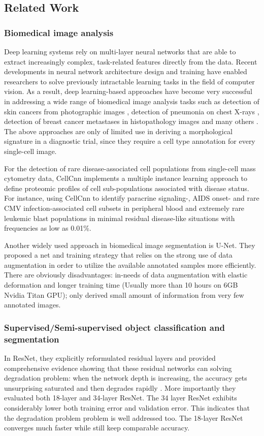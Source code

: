 \subsection{Related Work}
\subsubsection{Biomedical image analysis}

Deep learning systems rely on multi-layer neural networks that are able to extract increasingly complex, task-related features directly from the data. Recent developments in neural network architecture design and training have enabled researchers to solve previously intractable learning tasks in the field of computer vision. As a result, deep learning-based approaches have become very successful in addressing a wide range of biomedical image analysis tasks such as detection of skin cancers from photographic images \cite{b10}, detection of pneumonia on chest X-rays \cite{b13}, detection of breast cancer metastases in histopathology images and many others \cite{b2}. 
The above approaches are only of limited use in deriving a morphological signature in a diagnostic trial, since they require a cell type annotation for every single-cell image.


For the detection of rare disease-associated cell populations from single-cell mass cytometry data, CellCnn \cite{b3} implements a multiple instance learning approach to define proteomic profiles of cell sub-populations associated with disease status. For instance, using CellCnn to identify paracrine signaling-, AIDS onset- and rare CMV infection-associated cell subsets in peripheral blood and extremely rare leukemic blast populations in minimal residual disease-like situations with frequencies as low as 0.01\%\cite{b3}.

Another widely used approach in biomedical image segmentation is U-Net\cite{b14}. They proposed a net and training strategy that relies on the strong use of data augmentation in order to utilize the available annotated samples more efficiently\cite{b14}.
There are obviously disadvantages: in-needs of data augmentation with elastic deformation and longer training time (Usually more than 10 hours on 6GB Nvidia Titan GPU); only derived small amount of information from very few annotated images\cite{b14}.

\subsubsection{Supervised/Semi-supervised object classification and segmentation}
In ResNet\cite{b20}, they explicitly reformulated residual layers and provided comprehensive evidence showing that these residual networks can solving degradation problem: when the network depth is increasing, the accuracy gets unsurprising saturated and then degrades rapidly \cite{b20}.
More importantly they evaluated both 18-layer and 34-layer ResNet. The 34 layer ResNet exhibits considerably lower both training error and validation error. This indicates that the degradation problem problem is well addressed too. The 18-layer ResNet\cite{b20} converges much faster while still keep comparable accuracy. 

